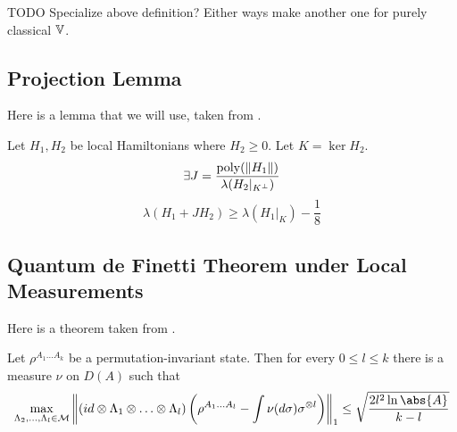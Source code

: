 TODO Specialize above definition? Either ways make another one for purely classical $\mathbb{V}$.

\subsection{Projection Lemma}

Here is a lemma that we will use, taken from \cite{kempe_kitaev_regev_2006}.
\begin{theorem}
	Let $H_1, H_2$ be local Hamiltonians where $H_2\geq0$. Let $K=\ker H_2$.
	$$\exists J=\frac{\operatorname*{\operatorname{poly}}(\left\lVert H_1\right\rVert)}{\lambda(H_2|_{K^\bot})}$$
	$$\lambda(H_1+JH_2)\geq\lambda(H_1\big|_K)-\frac{1}{8}$$
\end{theorem}

\subsection{Quantum de Finetti Theorem under Local Measurements}

Here is a theorem taken from \cite{Brandão2017}.
\begin{theorem}
	\label{deFinetti}
	Let $\rho^{A_1\ldots A_k}$ be a permutation-invariant state. Then for every $0\leq l\leq k$ there is a measure $\nu$ on $D(A)$ such that
	$$\max_{\Lambda_2,\ldots,\Lambda_l\in\mathcal{M}}\norm{(id\otimes\Lambda_1\otimes\ldots\otimes\Lambda_l)\left(\rho^{A_1\ldots A_l}-\int \nu(d\sigma)\sigma^{\otimes l}\right)}_1\leq\sqrt{\frac{2l^2\ln\abs{A}}{k-l}}$$
\end{theorem}

